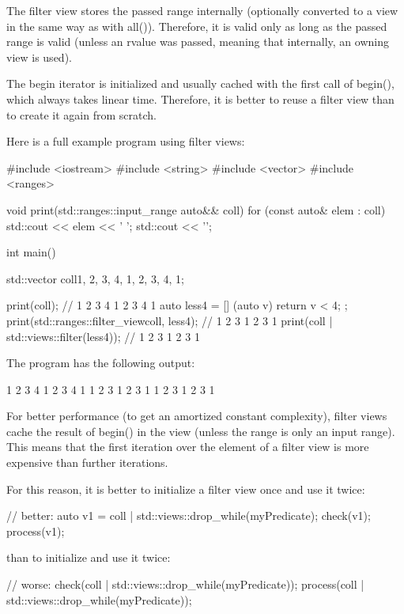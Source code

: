 The filter view stores the passed range internally (optionally converted to a view in the same way as with all()). Therefore, it is valid only as long as the passed range is valid (unless an rvalue was passed, meaning that internally, an owning view is used).

The begin iterator is initialized and usually cached with the first call of begin(), which always takes linear time. Therefore, it is better to reuse a filter view than to create it again from scratch.

Here is a full example program using filter views:


\begin{cpp}
#include <iostream>
#include <string>
#include <vector>
#include <ranges>

void print(std::ranges::input_range auto&& coll)
{
	for (const auto& elem : coll) {
		std::cout << elem << ' ';
	}
	std::cout << '\n';
}

int main()
{
	std::vector coll{1, 2, 3, 4, 1, 2, 3, 4, 1};
	
	print(coll); // 1 2 3 4 1 2 3 4 1
	auto less4 = [] (auto v) { return v < 4; };
	print(std::ranges::filter_view{coll, less4}); // 1 2 3 1 2 3 1
	print(coll | std::views::filter(less4)); // 1 2 3 1 2 3 1
}
\end{cpp}

The program has the following output:

\begin{shell}
1 2 3 4 1 2 3 4 1
1 2 3 1 2 3 1
1 2 3 1 2 3 1
\end{shell}


For better performance (to get an amortized constant complexity), filter views cache the result of begin() in the view (unless the range is only an input range). This means that the first iteration over the element of a filter view is more expensive than further iterations.

For this reason, it is better to initialize a filter view once and use it twice:

\begin{cpp}
// better:
auto v1 = coll | std::views::drop_while(myPredicate);
check(v1);
process(v1);
\end{cpp}

than to initialize and use it twice:

\begin{cpp}
// worse:
check(coll | std::views::drop_while(myPredicate));
process(coll | std::views::drop_while(myPredicate));
\end{cpp}

